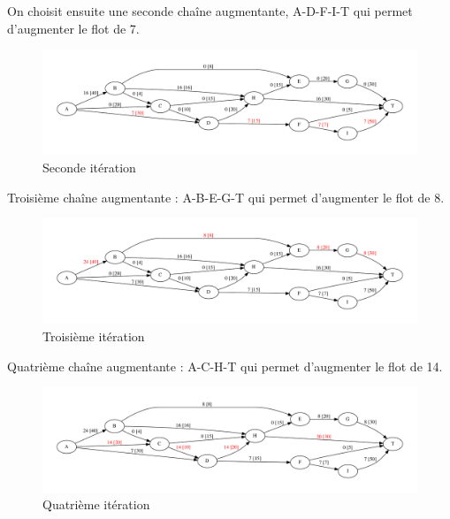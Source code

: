 \documentclass[paper=a4, fontsize=11pt]{scrartcl} %
\numberwithin{equation}{section} %
\numberwithin{figure}{section} %
\numberwithin{table}{section} %
\begin{document}
On choisit ensuite une seconde chaîne augmentante, A-D-F-I-T qui permet d'augmenter le flot de 7.

\begin{figure}[h]
\begin{center}
	\includegraphics[width=\textwidth]{figs/reseau-2.pdf}
	\caption{Seconde itération}
	\label{fig:res:2}
\end{center}
\end{figure}

Troisième chaîne augmentante : A-B-E-G-T qui permet d'augmenter le flot de 8. 

\begin{figure}[h]
\begin{center}
	\includegraphics[width=\textwidth]{figs/reseau-3.pdf}
	\caption{Troisième itération}
	\label{fig:res:3}
\end{center}
\end{figure}

Quatrième chaîne augmentante : A-C-H-T qui permet d'augmenter le flot de 14.

\begin{figure}[h]
\begin{center}
	\includegraphics[width=\textwidth]{figs/reseau-4.pdf}
	\caption{Quatrième itération}
	\label{fig:res:4}
\end{center}
\end{figure}
\end{document}
